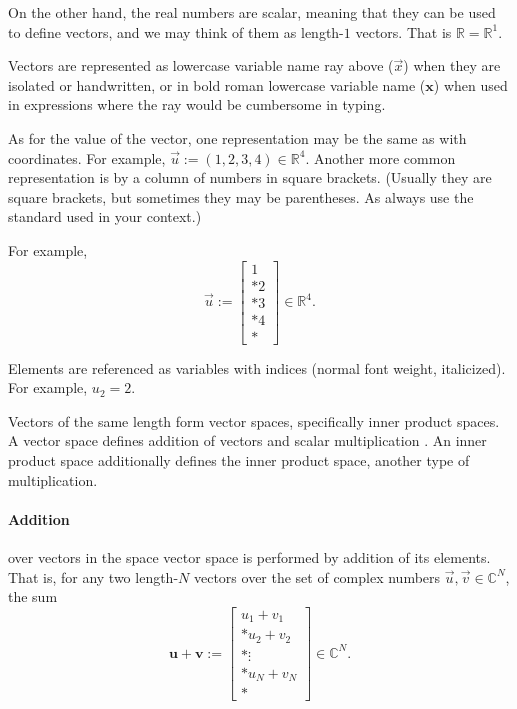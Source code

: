 \documentclass{article}
\begin{document}
On the other hand, the real numbers are scalar, meaning that they can be used to define vectors, and we may think of them as length-$1$ vectors. That is $\mathbb{R} = \mathbb{R}^1$.

Vectors are represented as lowercase variable name ray above ($\vec{x}$) when they are isolated or handwritten, or in bold roman lowercase variable name ($\mathbf{x}$) when used in expressions where the ray would be cumbersome in typing.

As for the value of the vector, one representation may be the same as with coordinates. For example, $\vec{u} := (1, 2, 3, 4) \in \mathbb{R}^4$. Another more common representation is by a column of numbers in square brackets. (Usually they are square brackets, but sometimes they may be parentheses. As always use the standard used in your context.)

For example,
\begin{equation}\label{eq:vec u}
    \vec{u} := \left[
        \begin{matrix}
            1 \\*
            2 \\*
            3 \\*
            4 \\*
        \end{matrix}
    \right] \in \mathbb{R}^4.
\end{equation}

Elements are referenced as variables with indices (normal font weight, italicized). For example, $u_2 = 2$.

Vectors of the same length form vector spaces, specifically inner product spaces.
A vector space defines addition of vectors
and scalar multiplication%
.
An inner product space additionally defines the inner product space, another type of multiplication.


\paragraph{Addition} over
vectors in the space vector space
is performed by addition of its elements. That is, for any two length-$N$ vectors over the set of complex numbers $\vec{u}, \vec{v} \in \mathbb{C}^N$, the sum
\begin{equation}
    \mathbf{u} + \mathbf{v} := \left[
        \begin{matrix}
            u_1 + v_1 \\*
            u_2 + v_2 \\*
            \vdots \\*
            u_N + v_N \\*
        \end{matrix}
    \right] \in \mathbb{C}^N.
\end{equation}
\end{document}
